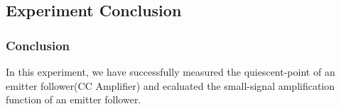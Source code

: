 
\subsection{Experiment Conclusion}
    \subsubsection{Conclusion}
    In this experiment, we have successfully measured the quiescent-point of an emitter follower(CC Amplifier) and ecaluated the small-signal amplification function of an emitter follower.
    
